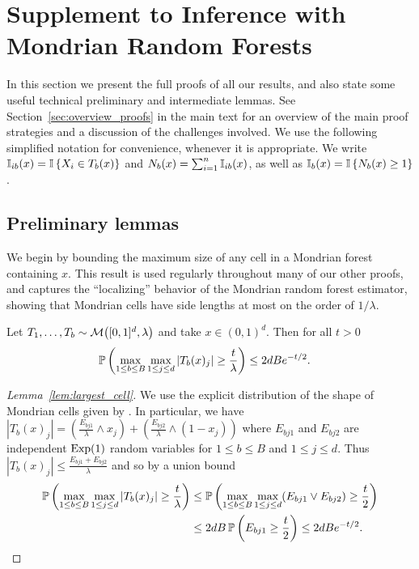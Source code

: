 
\chapter{Supplement to Inference with Mondrian Random Forests}
\label{app:mondrian}

In this section we present the full proofs of all our results,
and also state some useful technical preliminary and
intermediate lemmas.
See Section~\ref{sec:overview_proofs} in the main text
for an overview of the main proof strategies and a discussion of
the challenges involved.
We use the following simplified notation for convenience,
whenever it is appropriate.
We write $\I_{i b}(x) = \I \left\{ X_i \in T_b(x) \right\}$
and $N_b(x) = \sum_{i=1}^{n} \I_{i b}(x)$,
as well as $\I_b(x) = \I \left\{ N_b(x) \geq 1 \right\}$.

\section{Preliminary lemmas}

We begin by bounding the maximum size of any cell
in a Mondrian forest containing $x$.
This result is used regularly throughout many of our other proofs,
and captures the ``localizing'' behavior of the Mondrian random
forest estimator, showing that Mondrian cells have side lengths
at most on the order of $1/\lambda$.

\begin{lemma}%
  \label{lem:largest_cell}
  Let $T_1, \ldots, T_b \sim \cM\big([0,1]^d, \lambda\big)$
  and take $x \in (0,1)^d$. Then for all $t > 0$
  \begin{align*}
    \P \left(
      \max_{1 \leq b \leq B}
      \max_{1 \leq j \leq d}
      |T_b(x)_j|
      \geq \frac{t}{\lambda}
    \right)
    &\leq
    2dB e^{-t/2}.
  \end{align*}

\end{lemma}

\begin{proof}[Lemma~\ref{lem:largest_cell}]
  We use the explicit distribution of the shape of Mondrian cells
  given by \citet[Proposition~1]{mourtada2020minimax}.
  In particular, we have
  $|T_b(x)_j| = \left( \frac{E_{bj1}}{\lambda} \wedge x_j \right)
  + \left( \frac{E_{bj2}}{\lambda} \wedge (1-x_j) \right)$
  where $E_{bj1}$ and $E_{bj2}$
  are independent $\Exp(1)$ random variables for
  $1 \leq b \leq B$ and $1 \leq j \leq d$.
  Thus $|T_b(x)_j| \leq \frac{E_{bj1} + E_{bj2}}{\lambda}$
  and so by a union bound
  \begin{align*}
    \P \left(
      \max_{1 \leq b \leq B}
      \max_{1 \leq j \leq d}
      |T_b(x)_j|
      \geq \frac{t}{\lambda}
    \right)
    &\leq
    \P \left(
      \max_{1 \leq b \leq B}
      \max_{1 \leq j \leq d}
      (E_{bj1} \vee E_{bj2})
      \geq \frac{t}{2}
    \right) \\
    &\leq
    2dB\,
    \P \left(
      E_{bj1}
      \geq \frac{t}{2}
    \right)
    \leq
    2dB e^{-t/2}.
  \end{align*}
\end{proof}

